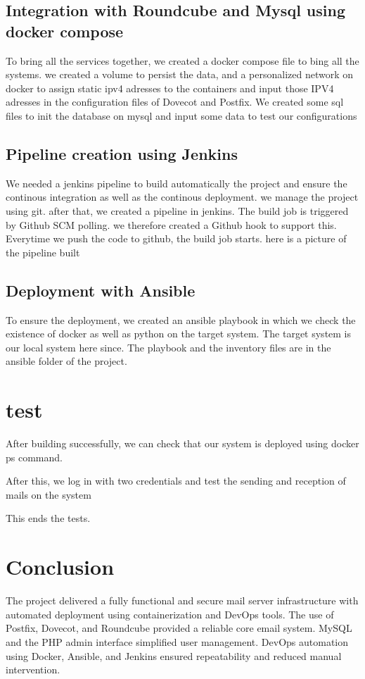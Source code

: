 \documentclass[12pt]{article}
\begin{document}
\subsection{Integration with Roundcube and Mysql using docker compose }
To bring all the services together, we created a docker compose file to bing all the systems. we created a volume to persist the data, and a personalized network on docker to assign static ipv4 adresses to the containers and input those IPV4 adresses in the configuration files 
of Dovecot and Postfix.  We created some sql files to init the database on mysql and input some data to test our configurations
\subsection{Pipeline creation using Jenkins}
We needed a jenkins pipeline to build automatically the project and ensure the continous integration as well as the continous deployment. we manage the project using git. 
after that, we created a pipeline in jenkins. The build job is triggered by Github SCM polling. we therefore created a Github hook to support this. Everytime we push the code to github, the build job starts. 
here is a picture of the pipeline built
\subsection{Deployment with Ansible}
To ensure the deployment, we created an ansible playbook in which we check the existence of docker as well as python on the target system. The target system is our local system here since. The playbook and the inventory files are in the ansible folder of the project. 
\section{test}
After building successfully, we can check that our system is deployed using docker ps command. 

After this, we log in with two credentials and test the sending and reception of mails on the system


This ends the tests. 

\section{Conclusion}
The project delivered a fully functional and secure mail server infrastructure with automated deployment using containerization and DevOps tools. The use of Postfix, Dovecot, and Roundcube provided a reliable core email system. MySQL and the PHP admin interface simplified user management. DevOps automation using Docker, Ansible, and Jenkins ensured repeatability and reduced manual intervention.
\end{document}
